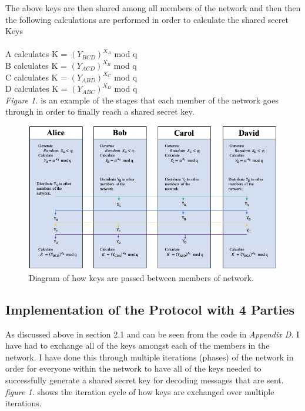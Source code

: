 \documentclass[a4paper, twoside, 11pt]{article}
\begin{document}
The above keys are then shared among all members of the network and then
then the following calculations are performed in order to calculate the shared secret Keys\\
\\
A calculates K = $(Y_{BCD})^{X_A}$ mod q \\
B calculates K = $(Y_{ACD})^{X_B}$ mod q \\
C calculates K = $(Y_{ABD})^{X_C}$ mod q \\
D calculates K = $(Y_{ABC})^{X_D}$ mod q \\


\textit{Figure 1.} is an example of the stages that each member of the network goes through in order to finally reach a shared secret key. 

\begin{figure}[H]
	\centering
	\includegraphics[scale=0.6]{Images/exchangeDiagram.png}
  \caption{Diagram of how keys are passed between members of network.}
\end{figure}
\subsection{Implementation of the Protocol with 4 Parties}
As discussed above in section 2.1 and can be seen from the code in \textit{Appendix D. } I have had to exchange all of the keys amongst each of the members in the network. I have done this through multiple iterations (phases) of the network in order
for everyone within the network to have all of the keys needed to successfully generate a shared secret key for decoding messages that are sent. 
\textit{figure 1.} shows the iteration cycle of how keys are exchanged over multiple iterations.
\end{document}
